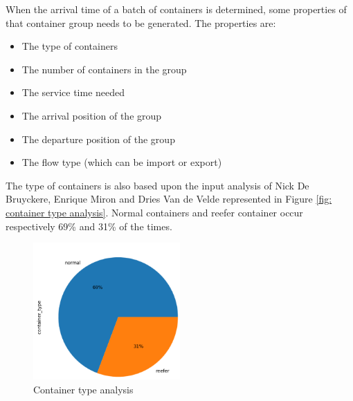 \documentclass[]{article}
\begin{document}
When the arrival time of a batch of containers is determined, some properties
of that container group needs to be generated. The properties are:
\begin{itemize}
	\item The type of containers
	\item The number of containers in the group
	\item The service time needed
	\item The arrival position of the group
	\item The departure position of the group
	\item The flow type (which can be import or export)
\end{itemize}

The type of containers is also based upon the input analysis of Nick De
Bruyckere, Enrique Miron and Dries Van de Velde represented in Figure \ref{fig:
	container type analysis}. Normal containers and reefer container occur
respectively 69\% and 31\% of the times.
\begin{figure}
	\centering
	\includegraphics[width=0.5\textwidth]{Afbeeldingen/container_type.png}
	\caption{Container type analysis}
	\label{fig: container type analysis}
\end{figure}
\end{document}
